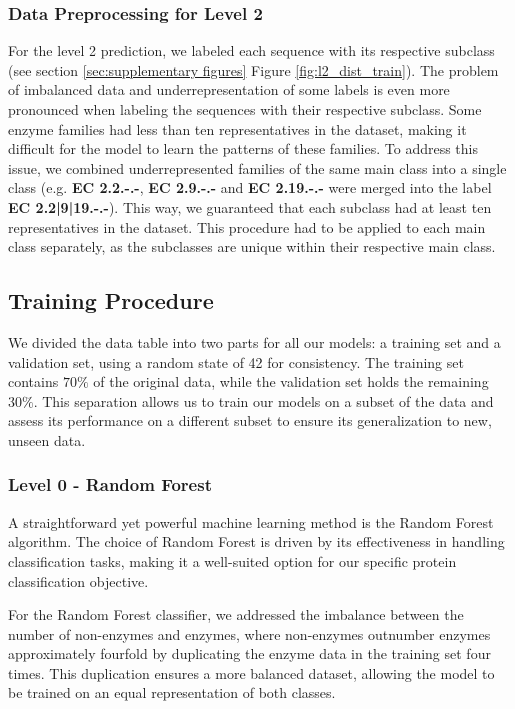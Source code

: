 \documentclass{bioinfo}
\begin{document}
\begin{methods}
\subsubsection{Data Preprocessing for Level 2}
For the level 2 prediction, we labeled each sequence with its respective subclass (see section \ref{sec:supplementary figures} Figure \ref{fig:l2_dist_train}).
The problem of imbalanced data and underrepresentation of some labels is even more pronounced when labeling the sequences with their respective subclass.
Some enzyme families had less than ten representatives in the dataset, making it difficult for the model to learn the patterns of these families.
To address this issue, we combined underrepresented families of the same main class into a single class 
(e.g. \textbf{EC 2.2.-.-}, \textbf{EC 2.9.-.-} and \textbf{EC 2.19.-.-} were merged into the label \textbf{EC 2.2|9|19.-.-}).
This way, we guaranteed that each subclass had at least ten representatives in the dataset.
This procedure had to be applied to each main class separately, as the subclasses are unique within their respective main class.

\subsection{Training Procedure}
We divided the data table into two parts for all our models: a training set and a validation set, using a random state of 42 for consistency. 
The training set contains $70\%$ of the original data, while the validation set holds the remaining $30\%$. 
This separation allows us to train our models on a subset of the data and assess its performance on a different subset to ensure its generalization to new, unseen data.

\subsubsection{Level 0 - Random Forest}
A straightforward yet powerful machine learning method is the Random
Forest algorithm. The choice of Random Forest is driven by its
effectiveness in handling classification tasks, making it a well-suited
option for our specific protein classification objective. 

For the Random Forest classifier, we addressed the imbalance between the number of non-enzymes and enzymes, where non-enzymes outnumber enzymes approximately
fourfold by duplicating the enzyme data in the training set four times.
This duplication ensures a more balanced dataset, allowing the model to
be trained on an equal representation of both classes.


\end{methods}
\end{document}
